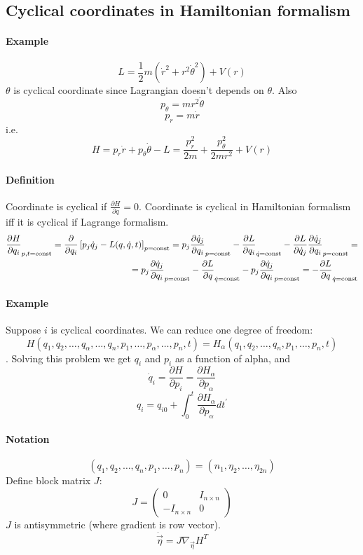 \subsection{Cyclical coordinates in Hamiltonian formalism}
\paragraph{Example}
$$L = \frac{1}{2}m \left( \dot{r}^2 + r^2\dot{\theta}^2 \right) + V(r)$$
$\theta$ is cyclical coordinate since Lagrangian doesn't depends on $\theta$. Also
$$p_\theta = mr^2\dot{\theta}$$
$$p_r = m\dot{r}$$
i.e.
$$H = p_r\dot{r} + p_\theta \dot{\theta} - L  = \frac{p_r^2}{2m} + \frac{p_\theta^2}{2mr^2} + V(r)$$

\paragraph{Definition}
Coordinate is cyclical  if $\frac{\partial H}{\partial \dot{q}} = 0$. Coordinate is cyclical in Hamiltonian formalism iff it is cyclical if Lagrange formalism.
\begin{align*}
\frac{\partial H}{\partial q_i}_{p,t=\textmd{const}} = \frac{\partial}{\partial q_i} \left[  p_j\dot{q}_j - L(q,\dot{q},t)\right]_{p=\textmd{const}} = p_j \frac{\partial \dot{q}_j}{\partial q_i}_{p=\textmd{const}} - \frac{\partial L}{\partial q_i}_{\dot{q}=\textmd{const}} - \frac{\partial L}{\partial \dot{q}_j}\frac{\partial \dot{q}_j}{\partial q_i}_{p=\textmd{const}} =\\= p_j \frac{\partial \dot{q}_j}{\partial q_i}_{p=\textmd{const}} - \frac{\partial L}{\partial q}_{\dot{q}=\textmd{const}} - p_j\frac{\partial \dot{q}_j}{\partial q_i}_{p=\textmd{const}} = - \frac{\partial L}{\partial q}_{\dot{q}=\textmd{const}} 
\end{align*}

\paragraph{Example}
Suppose $i$ is cyclical coordinates. We can reduce one degree of freedom: $$H(q_1, q_2, \dots, q_\alpha, \dots, q_n, p_1, \dots, p_\alpha, \dots, p_n, t) = H_\alpha(q_1, q_2, \dots, q_n, p_1, \dots, p_n, t)$$. Solving this problem we get $q_i$ and $p_i$ as a function of alpha, and
$$\dot{q}_i = \frac{\partial H}{\partial p_i} = \frac{\partial H_\alpha}{\partial p_\alpha}$$
$$q_i= q_{i0} + \int_0^t  \frac{\partial H_\alpha}{\partial p_\alpha} dt^\prime $$
\paragraph{Notation}
$$(q_1, q_2, \dots, q_n, p_1, \dots, p_n)= \left(n_1, \eta_2, \dots, \eta_{2n} \right)$$
Define block matrix $J$:
$$J = \begin{pmatrix}
0&I_{n\times n}\\-I_{n\times n} & 0
\end{pmatrix}$$
$J$ is antisymmetric (where gradient is row vector).
$$\dot{\vec{\eta}} = J \nabla_{\vec{\eta}} H^T$$

